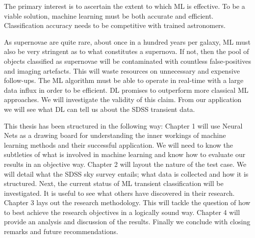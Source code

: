 The primary interest is to ascertain the extent to which ML is effective. 
To be a viable solution, machine learning must be both accurate and efficient.
Classification accuracy needs to be competitive with trained astronomers.

As supernovae are quite rare, about once in a hundred years per galaxy, ML must also be very stringent as to what constitutes a supernova.
If not, then the pool of objects classified as supernovae will be contaminated with countless false-positives and imaging artefacts.
This will waste resources on unnecessary and expensive follow-ups.
The ML algorithm must be able to operate in real-time with a large data influx in order to be efficient.
DL promises to outperform more classical ML approaches\citep{du2014machine}.
We will investigate the validity of this claim.
From our application we will see what DL can tell us about the SDSS transient data.

This thesis has been structured in the following way:
Chapter 1 will use Neural Nets as a drawing board for understanding the inner workings of machine learning methods and their successful application.
We will need to know the subtleties of what is involved in machine learning and know how to evaluate our results in an objective way.
Chapter 2 will layout the nature of the test case.
We will detail what the SDSS sky survey entails; what data is collected and how it is structured. 
Next, the current status of ML transient classification will be investigated.
It is useful to see what others have discovered in their research.
Chapter 3 lays out the research methodology.
This will tackle the question of how to best achieve the research objectives in a logically sound way.
Chapter 4 will provide an analysis and discussion of the results.
Finally we conclude with closing remarks and future recommendations.


